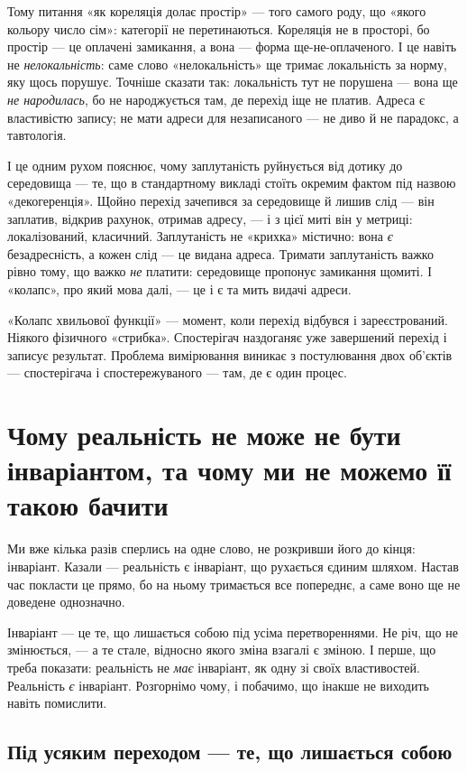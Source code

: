 \documentclass[12pt, a4paper, openany]{book}
\begin{document}
Тому питання «як кореляція долає простір» --- того самого роду, що «якого кольору число сім»: категорії не перетинаються. Кореляція не в просторі, бо простір --- це оплачені замикання, а вона --- форма ще-не-оплаченого. І це навіть не \emph{нелокальність}: саме слово «нелокальність» ще тримає локальність за норму, яку щось порушує. Точніше сказати так: локальність тут не порушена --- вона ще \emph{не народилась}, бо не народжується там, де перехід іще не платив. Адреса є властивістю запису; не мати адреси для незаписаного --- не диво й не парадокс, а тавтологія.

І це одним рухом пояснює, чому заплутаність руйнується від дотику до середовища --- те, що в стандартному викладі стоїть окремим фактом під назвою «декогеренція». Щойно перехід зачепився за середовище й лишив слід --- він заплатив, відкрив рахунок, отримав адресу, --- і з цієї миті він у метриці: локалізований, класичний. Заплутаність не «крихка» містично: вона \emph{є} безадресність, а кожен слід --- це видана адреса. Тримати заплутаність важко рівно тому, що важко \emph{не} платити: середовище пропонує замикання щомиті. І «колапс», про який мова далі, --- це і є та мить видачі адреси.

«Колапс хвильової функції» --- момент, коли перехід відбувся і зареєстрований. Ніякого фізичного «стрибка». Спостерігач наздоганяє уже завершений перехід і записує результат. Проблема вимірювання виникає з постулювання двох об'єктів --- спостерігача і спостережуваного --- там, де є один процес.

\section{Чому реальність не може не бути інваріантом, та чому ми не можемо її такою бачити}

Ми вже кілька разів сперлись на одне слово, не розкривши його до кінця: інваріант. Казали --- реальність є інваріант, що рухається єдиним шляхом. Настав час покласти це прямо, бо на ньому тримається все попереднє, а саме воно ще не доведене однозначно.

Інваріант --- це те, що лишається собою під усіма перетвореннями. Не річ, що не змінюється, --- а те стале, відносно якого зміна взагалі є зміною. І перше, що треба показати: реальність не \emph{має} інваріант, як одну зі своїх властивостей. Реальність \emph{є} інваріант. Розгорнімо чому, і побачимо, що інакше не виходить навіть помислити.

\subsection{Під усяким переходом --- те, що лишається собою}
\end{document}
